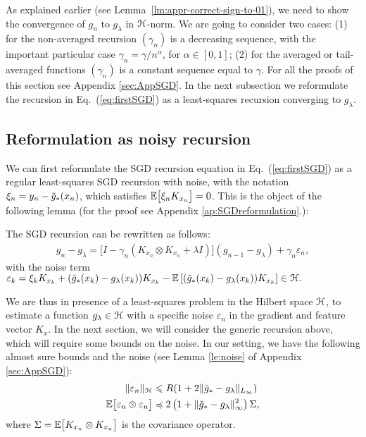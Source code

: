 \documentclass[final]{colt2018} %
\begin{document}
As explained earlier (see Lemma~\ref{lm:appr-correct-sign-to-01}), we need to show the convergence of ${g}_n$ to $g_\lambda$ in ${\mathcal H}$-norm. We are going to consider two cases: (1) for the non-averaged recursion $(\gamma_n)$ is a decreasing sequence, with the important particular case  $\gamma_n = \gamma/n^\alpha$, for $\alpha \in [0,1]$; (2) for the averaged or tail-averaged functions $(\gamma_n)$ is a constant sequence equal to $\gamma$.
%
For all the proofs of this section see Appendix  \ref{sec:AppSGD}.
%
In the next subsection we reformulate the recursion in Eq.~(\ref{eq:firstSGD}) as a least-squares recursion converging to $g_\lambda$.

\subsection{Reformulation as noisy recursion}

We can first reformulate the SGD recursion equation in Eq.~(\ref{eq:firstSGD}) as a regular least-squares SGD recursion with noise,
with the notation $\xi_n = y_n - \tilde{g}_* (x_n)$, which satisfies ${\mathbb E} \big[ \xi_n K_{x_n}  \big] =0$. This is the object of the following lemma (for the proof see Appendix \ref{ap:SGDreformulation}.):

\begin{lemma}
\label{le:SGDrecursion}
The SGD recursion can be rewritten as follows:
\begin{align}
\label{eq:SGDrecursion}
    {g}_n - g_\lambda =  \big[
I - \gamma_n   (  K_{x_n} \otimes K_{x_n} + \lambda I ) \big]
  ( {g}_{n-1} - g_\lambda )   + \gamma_n \varepsilon_n,
\end{align}
%
with the noise term $\varepsilon_k  =   \xi_k K_{x_k}   +   (\tilde{g}_*(x_k)- g_\lambda(x_k)) K_{x_k} - {\mathbb E} \left[ (\tilde{g}_*(x_k)- g_\lambda(x_k)) K_{x_k} \right] \in {\mathcal H}.$
\end{lemma}
%
We are thus in presence of a least-squares problem in the Hilbert space ${\mathcal H}$, to estimate a function $g_\lambda \in {\mathcal H}$ with a specific noise $\varepsilon_n$ in the gradient and feature vector $K_{x}$. In the next section, we will consider the generic recursion above, which will require some bounds on the noise. In our setting, we have the following almost sure bounds and the noise (see Lemma \ref{le:noise} of  Appendix \ref{sec:AppSGD}):
\begin{align*}
 \| \varepsilon_n \|_{\mathcal H} &\leqslant R  ( 1 + 2 \| \tilde{g}_* - g_\lambda\|_{L_\infty} )  \\
{\mathbb E} \big[ \varepsilon_n \otimes \varepsilon_n \big]
& \preccurlyeq 2 \left(1+\|\tilde{g}_*- g_\lambda\|^2_\infty\right) \Sigma,
\end{align*} 
%
where $\Sigma = {\mathbb E} \big[ K_{x_n} \otimes K_{x_n} \big]$ is the covariance operator.
\end{document}
